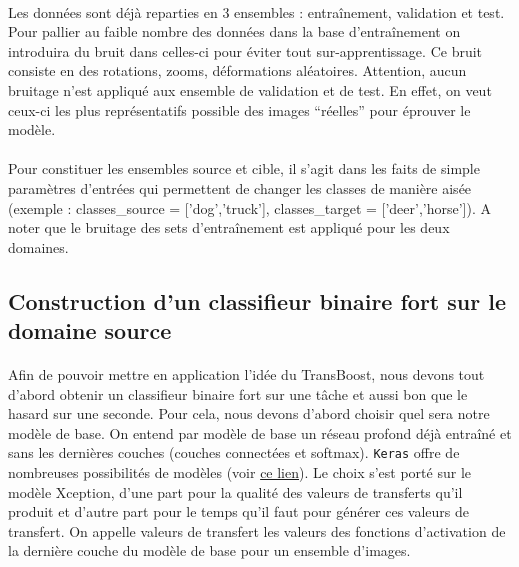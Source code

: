 \documentclass[11 pt]{article}
\begin{document}
\paragraph{}Les données sont déjà reparties en 3 ensembles : entraînement, validation et test. Pour pallier au faible nombre des données dans la base d’entraînement on introduira du bruit dans celles-ci pour éviter tout sur-apprentissage. Ce bruit consiste en des rotations, zooms, déformations aléatoires. Attention, aucun bruitage n’est appliqué aux ensemble de validation et de test. En effet, on veut ceux-ci les plus représentatifs possible des images “réelles” pour éprouver le modèle.

\paragraph{}Pour constituer les ensembles source et cible, il s’agit dans les faits de simple paramètres d’entrées qui permettent de changer les classes de manière aisée (exemple : classes\_source = ['dog','truck'], classes\_target = ['deer','horse']). A noter que le bruitage des sets d’entraînement est appliqué pour les deux domaines.



\subsection{Construction d'un classifieur binaire fort sur le domaine source}
\paragraph{}Afin de pouvoir mettre en application l’idée du TransBoost, nous devons tout d’abord obtenir un classifieur binaire fort sur une tâche et aussi bon que le hasard sur une seconde. Pour cela, nous devons d’abord choisir quel sera notre modèle de base. On entend par modèle de base un réseau profond déjà entraîné et sans les dernières couches (couches connectées et softmax). \texttt{Keras} offre de nombreuses possibilités de modèles (voir \href{https://keras.io/applications/}{ce lien}). Le choix s’est porté sur le modèle Xception, d’une part pour la qualité des valeurs de transferts qu’il produit et d’autre part pour le temps qu’il faut pour générer ces valeurs de transfert. On appelle valeurs de transfert les valeurs des fonctions d’activation de la dernière couche du modèle de base pour un ensemble d’images.
\end{document}
